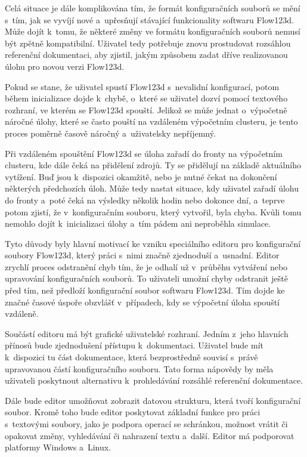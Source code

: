 \documentclass[FM,bw,DP]{tulthesis}
\begin{document}
Celá situace je dále komplikována tím, že formát konfiguračních souborů se mění s~tím, jak se vyvíjí nové a~upřesňují stávající funkcionality softwaru Flow123d. Může dojít k~tomu, že některé změny ve formátu konfiguračních souborů nemusí být zpětně kompatibilní. Uživatel tedy potřebuje znovu prostudovat rozsáhlou referenční dokumentaci, aby zjistil, jakým způsobem zadat dříve realizovanou úlohu pro novou verzi Flow123d.

Pokud se stane, že uživatel spustí Flow123d s~nevalidní konfigurací, potom během inicializace dojde k~chybě, o~které se uživatel dozví pomocí textového rozhraní, ve kterém se Flow123d spouští. Jelikož se může jednat o~výpočetně náročné úlohy, které se často pouští na vzdáleném výpočetním clusteru, je tento proces poměrně časově náročný a~uživatelsky nepříjemný.

Při vzdáleném spouštění Flow123d se úloha zařadí do fronty na výpočetním clusteru, kde dále čeká na přidělení zdrojů. Ty se přidělují na základě aktuálního vytížení. Buď jsou k~dispozici okamžitě, nebo je nutné čekat na dokončení některých předchozích úloh. Může tedy nastat situace, kdy uživatel zařadí úlohu do fronty a~poté čeká na výsledky několik hodin nebo dokonce dní, a~teprve potom zjistí, že v~konfiguračním souboru, který vytvořil, byla chyba. Kvůli tomu nemohlo dojít k~inicializaci úlohy a~tím pádem ani neproběhla simulace.

Tyto důvody byly hlavní motivací ke vzniku speciálního editoru pro konfigurační soubory Flow123d, který práci s~nimi značně zjednoduší a~usnadní. Editor zrychlí proces odstranění chyb tím, že je odhalí už v~průběhu vytváření nebo upravování konfiguračních souborů. To uživateli umožní chyby odstranit ještě před tím, než předloží konfigurační soubor softwaru Flow123d. Tím dojde ke značné časové úspoře obzvlášť v~případech, kdy se výpočetní úloha spouští vzdáleně.

Součástí editoru má být grafické uživatelské rozhraní. Jedním z~jeho hlavních přínosů bude zjednodušení přístupu k~dokumentaci. Uživatel bude mít k~dispozici tu část dokumentace, která bezprostředně souvisí s~právě upravovanou částí konfiguračního souboru. Tato forma nápovědy by měla uživateli poskytnout alternativu k~prohledávání rozsáhlé referenční dokumentace.

Dále bude editor umožňovat zobrazit datovou strukturu, která tvoří konfigurační soubor. Kromě toho bude editor poskytovat základní funkce pro práci s~textovými soubory, jako je podpora operací se schránkou, možnost vrátit či opakovat změny, vyhledávání či nahrazení textu a~další. Editor má podporovat platformy Windows a~Linux.
\end{document}
